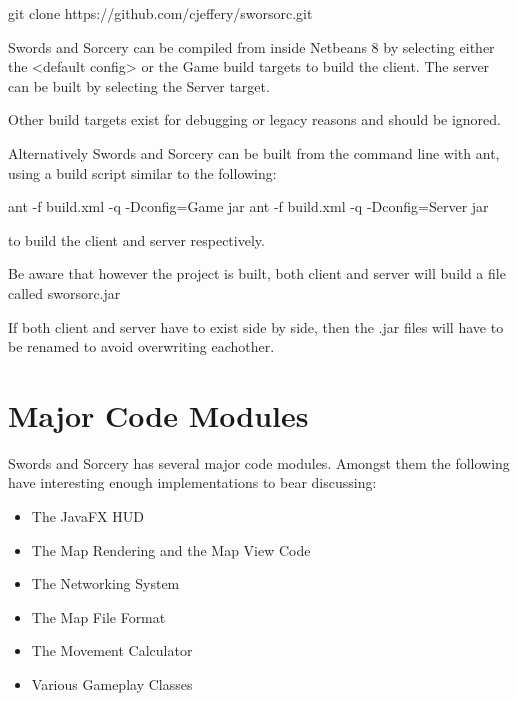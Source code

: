 \documentclass[12pt,a4paper]{article}
\begin{document}
    git clone https://github.com/cjeffery/sworsorc.git

Swords and Sorcery can be compiled from inside Netbeans 8 by selecting either
the <default config> or the Game build targets to build the client. The server
can be built by selecting the Server target.

Other build targets exist for debugging or legacy reasons and should be ignored.

Alternatively Swords and Sorcery can be built from the command line with ant,
using a build script similar to the following:

    ant -f build.xml -q -Dconfig=Game jar
    ant -f build.xml -q -Dconfig=Server jar

to build the client and server respectively.

Be aware that however the project is built, 
both client and server will build a file called sworsorc.jar

If both client and server have to exist side by side,
then the .jar files will have to be renamed to avoid overwriting eachother.

\section{Major Code Modules}
Swords and Sorcery has several major code modules. Amongst them the following
have interesting enough implementations to bear discussing:

\begin{itemize}
	\item The JavaFX HUD	
	\item The Map Rendering and the Map View Code
	\item The Networking System
	\item The Map File Format
	\item The Movement Calculator
    \item Various Gameplay Classes
\end{itemize}

\end{document}
